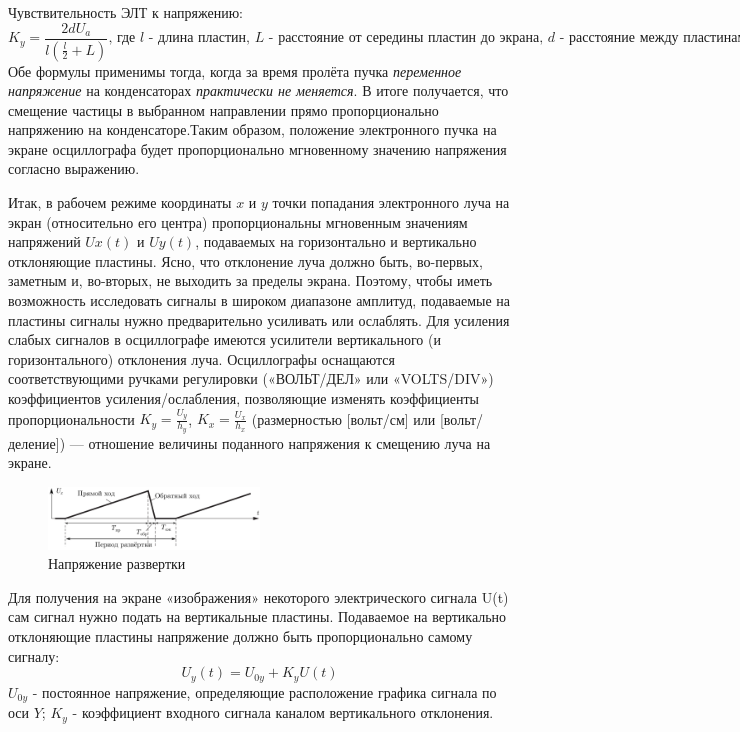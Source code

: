 \documentclass[a4paper]{article}
\begin{document}
Чувствительность ЭЛТ к напряжению: 
\[K_{y} =\frac{2dU_{a}}{l(\frac{l}{2} + L)} \text{,  где $l$ - длина пластин, $L$ - расстояние от середины пластин до экрана, $d$ - расстояние между пластинами.}\]
Обе формулы применимы тогда, когда за время пролёта пучка \textit{переменное напряжение} на конденсаторах \textit{практически не меняется}. В итоге получается, что смещение частицы в выбранном направлении прямо пропорционально напряжению на конденсаторе.Таким образом, положение электронного пучка на экране осциллографа будет пропорционально мгновенному значению напряжения согласно выражению.

Итак, в рабочем режиме координаты $x$ и $y$ точки попадания электронного луча на экран (относительно его центра) пропорциональны мгновенным значениям напряжений $Ux(t)$ и $Uy(t)$, подаваемых на горизонтально и вертикально отклоняющие пластины. Ясно, что отклонение луча должно быть, во-первых, заметным и, во-вторых, не выходить за пределы экрана. Поэтому, чтобы иметь возможность исследовать сигналы в широком диапазоне амплитуд, подаваемые на пластины сигналы нужно предварительно усиливать или ослаблять. Для усиления слабых сигналов в осциллографе имеются усилители вертикального (и горизонтального) отклонения луча. Осциллографы оснащаются соответствующими ручками регулировки («ВОЛЬТ/ДЕЛ» или «VOLTS/DIV») коэффициентов усиления/ослабления, позволяющие изменять коэффициенты пропорциональности $K_{y} = \frac{U_{y}}{h_{y}}$, $K_{x} = \frac{U_{x}}{h_{x}}$ (размерностью [вольт/см] или [вольт/деление]) — отношение величины поданного напряжения к смещению луча на экране.


\begin{figure}
\centering
\includegraphics[width=0.5\textwidth]{3.png}
\caption{Напряжение развертки}
\end{figure}

Для получения на экране «изображения» некоторого электрического сигнала U(t) сам сигнал нужно подать на вертикальные пластины. Подаваемое на вертикально отклоняющие пластины напряжение должно быть пропорционально самому сигналу:  
\[ U_y(t) = U_{0y}+K_{y}U(t)\]
$U_{0y}$ - постоянное напряжение, определяющие расположение графика сигнала по оси $Y$; $K_{y}$ - коэффициент входного сигнала каналом вертикального отклонения.
\end{document}
